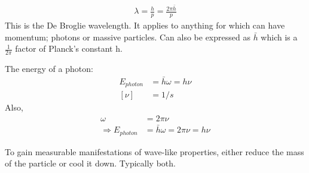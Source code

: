 \begin{align}
  \lambda = \frac{h}{p} = \frac{2\pi\bar{h}}{p}
\end{align}
This is the De Broglie wavelength. It applies to anything for which can have momentum; photons or massive particles. Can also be expressed as $\bar{h}$ which is a $\frac{1}{2\pi}$ factor of Planck's constant h.

The energy of a photon:
\begin{align}
  E_{photon}& = \bar{h} \omega = h \nu\\
  [\nu] &= 1/s
\end{align}
Also,
\begin{align}
  \omega& = 2\pi\nu\\
  \Rightarrow E_{photon}& = \bar{h}\omega = 2\pi\nu = h \nu
\end{align}

To gain measurable manifestations of wave-like properties, either reduce the mass of the particle or cool it down. Typically both.